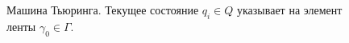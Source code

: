 \begin{figure}
\centering



\caption{Машина Тьюринга. Текущее состояние $q_i \in Q$ указывает на
  элемент ленты $\gamma_0 \in \Gamma$.} 
\label{figAddAlgoTuring}
\end{figure}
